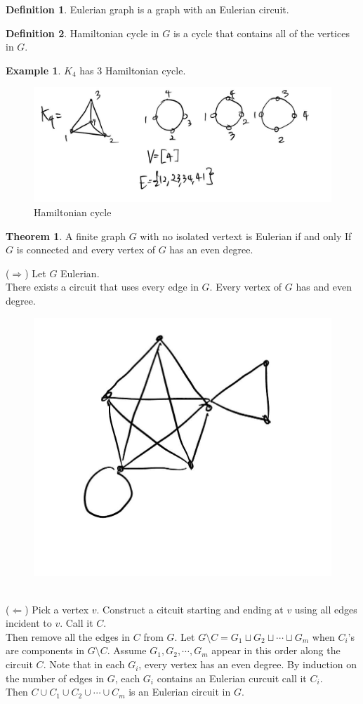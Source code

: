 \documentclass{article}
\theoremstyle{definition}
\newtheorem{defn}{Definition}[]
\newtheorem{thm}{Theorem}[]
\newtheorem{ex}{Example}[]
\newenvironment{pf*}{\pushQED{\qed}\pf}{\popQED\endpf}
\begin{document}
\begin{defn}
    Eulerian graph is a graph with an Eulerian circuit.
\end{defn}
\begin{defn}
    Hamiltonian cycle in $G$ is a cycle that contains all
    of the vertices in $G$.
\end{defn}
\begin{ex}
    $K_4$ has 3 Hamiltonian cycle.
    \begin{figure}[!h]
        \centerline{\includegraphics[width=0.5\columnwidth]{img/ham.jpg}}
        \caption{Hamiltonian cycle}
        \label{ham} 
    \end{figure}
\end{ex}
\begin{thm}
    A finite graph $G$ with no isolated vertext is Eulerian if and only If
    $G$ is connected and every vertex of $G$ has an even degree.
\end{thm}
\begin{pf*}
    ($\Rightarrow$) Let $G$ Eulerian. \\
    There exists a circuit that uses every edge in $G$. 
    Every vertex of $G$ has and even degree.
    \begin{figure}[!h]
        \centerline{\includegraphics[width=0.5\columnwidth]{img/even_proof.jpg}}
        \caption{}
        \label{even pf} 
    \end{figure}\\
    ($\Leftarrow$) Pick a vertex $v$. Construct a citcuit starting and ending at $v$
    using all edges incident to $v$. Call it $C$. \\ 
    Then remove all the edges in $C$ from $G$. Let $G \setminus C = G_1 
    \sqcup G_2 \sqcup \cdots \sqcup G_m$
    when $C_i$'s are components in $G\setminus C$. Assume $G_1, G_2, \cdots,
    G_m$ appear in this order along the circuit $C$. Note that 
    in each $G_i$, every vertex has an even degree. By induction
    on the number of edges in $G$, each $G_i$ contains an Eulerian curcuit
    call it $C_i$. \\ 
    Then $C\cup C_1 \cup C_2 \cup \cdots \cup C_m$ is an Eulerian circuit
    in $G$.
\end{pf*}
\end{document}
